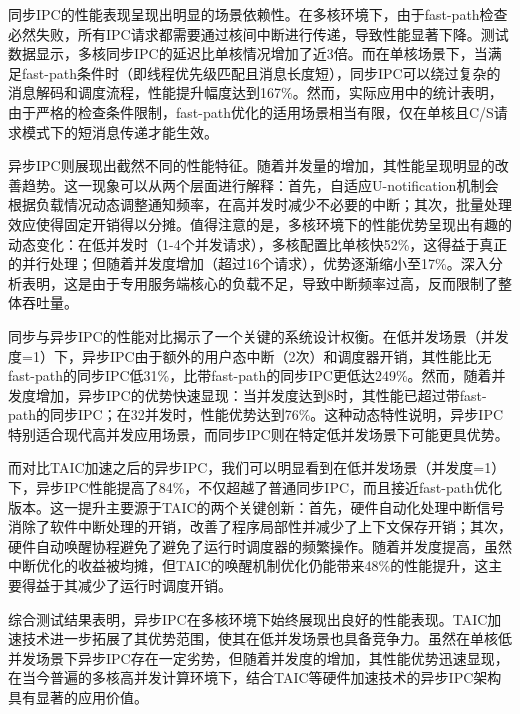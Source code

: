 同步IPC的性能表现呈现出明显的场景依赖性。在多核环境下，由于fast-path检查必然失败，所有IPC请求都需要通过核间中断进行传递，导致性能显著下降。测试数据显示，多核同步IPC的延迟比单核情况增加了近3倍。而在单核场景下，当满足fast-path条件时（即线程优先级匹配且消息长度短），同步IPC可以绕过复杂的消息解码和调度流程，性能提升幅度达到167\%。然而，实际应用中的统计表明，由于严格的检查条件限制，fast-path优化的适用场景相当有限，仅在单核且C/S请求模式下的短消息传递才能生效。

异步IPC则展现出截然不同的性能特征。随着并发量的增加，其性能呈现明显的改善趋势。这一现象可以从两个层面进行解释：首先，自适应U-notification机制会根据负载情况动态调整通知频率，在高并发时减少不必要的中断；其次，批量处理效应使得固定开销得以分摊。值得注意的是，多核环境下的性能优势呈现出有趣的动态变化：在低并发时（1-4个并发请求），多核配置比单核快52\%，这得益于真正的并行处理；但随着并发度增加（超过16个请求），优势逐渐缩小至17\%。深入分析表明，这是由于专用服务端核心的负载不足，导致中断频率过高，反而限制了整体吞吐量。

同步与异步IPC的性能对比揭示了一个关键的系统设计权衡。在低并发场景（并发度=1）下，异步IPC由于额外的用户态中断（2次）和调度器开销，其性能比无fast-path的同步IPC低31\%，比带fast-path的同步IPC更低达249\%。然而，随着并发度增加，异步IPC的优势快速显现：当并发度达到8时，其性能已超过带fast-path的同步IPC；在32并发时，性能优势达到76\%。这种动态特性说明，异步IPC特别适合现代高并发应用场景，而同步IPC则在特定低并发场景下可能更具优势。

而对比TAIC加速之后的异步IPC，我们可以明显看到在低并发场景（并发度=1）下，异步IPC性能提高了84\%，不仅超越了普通同步IPC，而且接近fast-path优化版本。这一提升主要源于TAIC的两个关键创新：首先，硬件自动化处理中断信号消除了软件中断处理的开销，改善了程序局部性并减少了上下文保存开销；其次，硬件自动唤醒协程避免了避免了运行时调度器的频繁操作。随着并发度提高，虽然中断优化的收益被均摊，但TAIC的唤醒机制优化仍能带来48\%的性能提升，这主要得益于其减少了运行时调度开销。

综合测试结果表明，异步IPC在多核环境下始终展现出良好的性能表现。TAIC加速技术进一步拓展了其优势范围，使其在低并发场景也具备竞争力。虽然在单核低并发场景下异步IPC存在一定劣势，但随着并发度的增加，其性能优势迅速显现，在当今普遍的多核高并发计算环境下，结合TAIC等硬件加速技术的异步IPC架构具有显著的应用价值。


